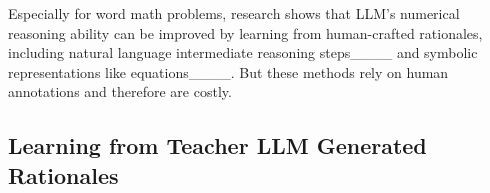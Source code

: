 

Especially for word math problems, research shows that LLM's numerical reasoning ability can be improved by learning from human-crafted rationales, including natural language intermediate reasoning steps____ and symbolic representations like equations____. 
But these methods rely on human annotations and therefore are costly. 

\subsection{Learning from Teacher LLM Generated Rationales}

